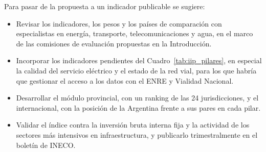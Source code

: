 Para pasar de la propuesta a un indicador publicable se sugiere:
\begin{itemize}
\item Revisar los indicadores, los pesos y los países de comparación con especialistas en energía, transporte, telecomunicaciones y agua, en el marco de las comisiones de evaluación propuestas en la Introducción.
\item Incorporar los indicadores pendientes del Cuadro~\ref{tab:iip_pilares}, en especial la calidad del servicio eléctrico y el estado de la red vial, para los que habría que gestionar el acceso a los datos con el ENRE y Vialidad Nacional.
\item Desarrollar el módulo provincial, con un ranking de las 24 jurisdicciones, y el internacional, con la posición de la Argentina frente a sus pares en cada pilar.
\item Validar el índice contra la inversión bruta interna fija y la actividad de los sectores más intensivos en infraestructura, y publicarlo trimestralmente en el boletín de INECO.
\end{itemize}

%
%
%
%
%
%
%
%
%
